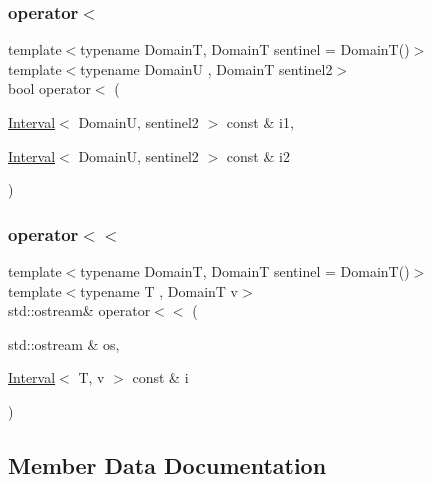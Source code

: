 \subsubsection{\texorpdfstring{operator$<$}{operator<}}
{\footnotesize\ttfamily template$<$typename DomainT, DomainT sentinel = Domain\+T()$>$ \\
template$<$typename DomainU , DomainT sentinel2$>$ \\
bool operator$<$ (\begin{DoxyParamCaption}\item[{\hyperlink{structvt_1_1term_1_1interval_1_1_interval}{Interval}$<$ DomainU, sentinel2 $>$ const \&}]{i1,  }\item[{\hyperlink{structvt_1_1term_1_1interval_1_1_interval}{Interval}$<$ DomainU, sentinel2 $>$ const \&}]{i2 }\end{DoxyParamCaption})\hspace{0.3cm}{\ttfamily [friend]}}

\mbox{\label{structvt_1_1term_1_1interval_1_1_interval_a764fa3f5ff6c49067c4c36a35b498c8b}} 
\subsubsection{\texorpdfstring{operator$<$$<$}{operator<<}}
{\footnotesize\ttfamily template$<$typename DomainT, DomainT sentinel = Domain\+T()$>$ \\
template$<$typename T , DomainT v$>$ \\
std\+::ostream\& operator$<$$<$ (\begin{DoxyParamCaption}\item[{std\+::ostream \&}]{os,  }\item[{\hyperlink{structvt_1_1term_1_1interval_1_1_interval}{Interval}$<$ T, v $>$ const \&}]{i }\end{DoxyParamCaption})\hspace{0.3cm}{\ttfamily [friend]}}



\subsection{Member Data Documentation}
\mbox{\label{structvt_1_1term_1_1interval_1_1_interval_a12aa2c05e55f64d6b83f66fbeabddf47}} 
